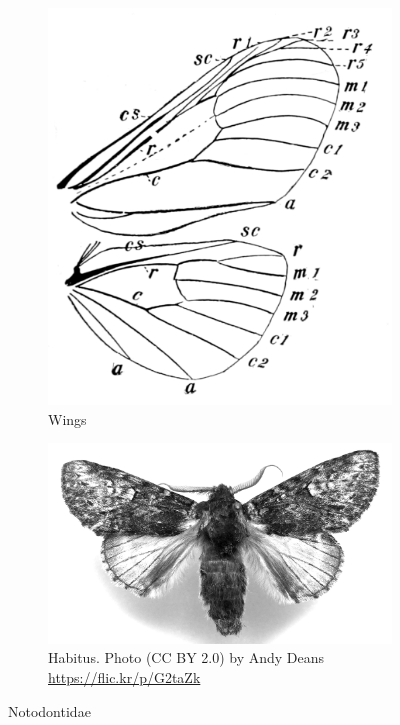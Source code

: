 \documentclass[letterpaper, 11pt]{article}
\begin{document}
\begin{figure}[ht!]
    \centering
    \begin{subfigure}[ht!]{0.32\textwidth}
        \includegraphics[width=\textwidth]{NotodontidWings}
        \caption{Wings \citep[][Fig. 443]{bhl83152}}
        \label{fig:notodontid1}
    \end{subfigure}
    \hfill %
    \begin{subfigure}[ht!]{0.5\textwidth}
        \includegraphics[width=\textwidth]{notodontid.png}
        \caption{Habitus. Photo (CC BY 2.0) by Andy Deans \url{https://flic.kr/p/G2taZk}}
        \label{fig:notodontid2}
    \end{subfigure}
    \caption{Notodontidae}\label{fig:notodontids}
\end{figure}
\end{document}
